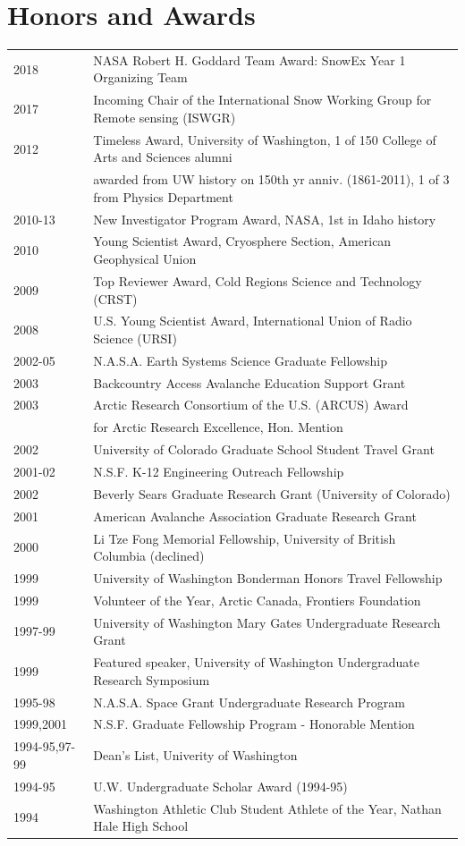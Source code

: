 \documentclass[11pt]{article}
\begin{document}
\section*{Honors and Awards}
\begin{tabular}{ll}
2018 & NASA Robert H. Goddard Team Award: SnowEx Year 1 Organizing Team \\
2017 & Incoming Chair of the International Snow Working Group for Remote sensing (ISWGR) \\
2012 & Timeless Award, University of Washington, 1 of 150 College of Arts and Sciences alumni  \\
& awarded from UW history on 150th yr anniv. (1861-2011), 1 of 3 from Physics Department \\
2010-13 & New Investigator Program Award, NASA, 1st in Idaho history \\
2010 & Young Scientist Award, Cryosphere Section, American Geophysical Union \\
2009 & Top Reviewer Award, Cold Regions Science and Technology (CRST) \\
2008 & U.S. Young Scientist Award, International Union of Radio Science (URSI) \\
2002-05 & N.A.S.A. Earth Systems Science Graduate Fellowship \\
2003 & Backcountry Access Avalanche Education Support Grant \\
2003 & Arctic Research Consortium of the U.S. (ARCUS) Award \\
& for Arctic Research Excellence, Hon. Mention \\
2002 & University of Colorado Graduate School Student Travel Grant \\
2001-02 & N.S.F. K-12 Engineering Outreach Fellowship \\
2002 & Beverly Sears Graduate Research Grant (University of Colorado) \\
2001 & American Avalanche Association Graduate Research Grant \\
2000 & Li Tze Fong Memorial Fellowship, University of British Columbia (declined) \\
1999 & University of Washington Bonderman Honors Travel Fellowship \\
1999 & Volunteer of the Year, Arctic Canada, Frontiers Foundation \\
1997-99 & University of Washington Mary Gates Undergraduate Research Grant \\
1999 & Featured speaker, University of Washington Undergraduate Research Symposium \\
1995-98 & N.A.S.A. Space Grant Undergraduate Research Program \\
1999,2001 & N.S.F. Graduate Fellowship Program - Honorable Mention \\
1994-95,97-99 & Dean's List, Univerity of Washington \\
1994-95 & U.W. Undergraduate Scholar Award (1994-95) \\
1994 & Washington Athletic Club Student Athlete of the Year, Nathan Hale High School \\
\end{tabular}
\end{document}
